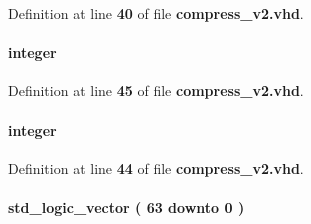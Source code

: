 Definition at line {\bf 40} of file {\bf compress\+\_\+v2.\+vhd}.

\paragraph[{tst\+\_\+lsb}]{ {\bfseries \textcolor{comment}{integer}\textcolor{vhdlchar}{ }} \hspace{0.3cm}{\ttfamily [Signal]}}\label{classcompress__v2_1_1arch_a2f12405ba8d17fed532c9424cce375e5}


Definition at line {\bf 45} of file {\bf compress\+\_\+v2.\+vhd}.

\paragraph[{tst\+\_\+msb}]{ {\bfseries \textcolor{comment}{integer}\textcolor{vhdlchar}{ }} \hspace{0.3cm}{\ttfamily [Signal]}}\label{classcompress__v2_1_1arch_ad265f7a535bfee23ef1f894050ac781f}


Definition at line {\bf 44} of file {\bf compress\+\_\+v2.\+vhd}.

\paragraph[{tst\+\_\+out}]{ {\bfseries \textcolor{comment}{std\+\_\+logic\+\_\+vector}\textcolor{vhdlchar}{ }\textcolor{vhdlchar}{(}\textcolor{vhdlchar}{ }\textcolor{vhdlchar}{ } \textcolor{vhdldigit}{63} \textcolor{vhdlchar}{ }\textcolor{keywordflow}{downto}\textcolor{vhdlchar}{ }\textcolor{vhdlchar}{ } \textcolor{vhdldigit}{0} \textcolor{vhdlchar}{ }\textcolor{vhdlchar}{)}\textcolor{vhdlchar}{ }} \hspace{0.3cm}{\ttfamily [Signal]}}\label{classcompress__v2_1_1arch_a7ef03714b7952638e3df81340e2dd0b8}


